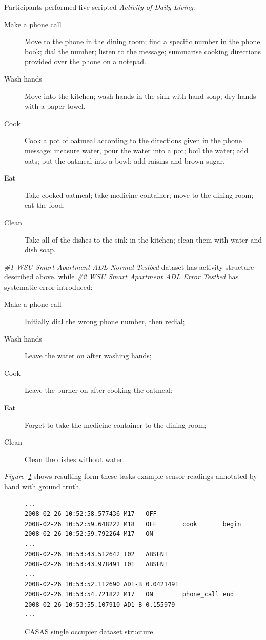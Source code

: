 \documentclass[10pt, a4paper, pdflatex, leqno, twoside, openright]{report}
\begin{document}
Participants performed five scripted \emph{Activity of Daily Living}:
\begin{description}
\item[Make a phone call] Move to the phone in the dining room; find a specific number in the phone book; dial the number; listen to the message; summarise cooking directions provided over the phone on a notepad.
\item[Wash hands] Move into the kitchen; wash hands in the sink with hand soap; dry hands with a paper towel.
\item[Cook] Cook a pot of oatmeal according to the directions given in the phone message: measure water, pour the water into a pot; boil the water; add oats; put the oatmeal into a bowl; add raisins and brown sugar.
\item[Eat] Take cooked oatmeal; take medicine container; move to the dining room; eat the food.
\item[Clean] Take all of the dishes to the sink in the kitchen; clean them with water and dish soap.
\end{description}

\emph{\#1 WSU Smart Apartment ADL Normal Testbed} dataset has activity structure described above, while \emph{\#2 WSU Smart Apartment ADL Error Testbed} has systematic error introduced:
\begin{description}
\item[Make a phone call] Initially dial the wrong phone number, then redial;
\item[Wash hands] Leave the water on after washing hands;
\item[Cook] Leave the burner on after cooking the oatmeal;
\item[Eat] Forget to take the medicine container to the dining room;
\item[Clean] Clean the dishes without water.
\end{description}

\emph{Figure~\ref{lst:CASASoneR}} shows resulting form these tasks example sensor readings annotated by hand with ground truth.
\begin{figure}[htb]
  \begin{lstlisting}
...
2008-02-26 10:52:58.577436 M17   OFF
2008-02-26 10:52:59.648222 M18   OFF       cook       begin
2008-02-26 10:52:59.792264 M17   ON
...
2008-02-26 10:53:43.512642 I02   ABSENT
2008-02-26 10:53:43.978491 I01   ABSENT
...
2008-02-26 10:53:52.112690 AD1-B 0.0421491
2008-02-26 10:53:54.721822 M17   ON        phone_call end
2008-02-26 10:53:55.107910 AD1-B 0.155979
...
  \end{lstlisting}
  \caption{CASAS single occupier dataset structure.\label{lst:CASASoneR}}
\end{figure}
\end{document}
